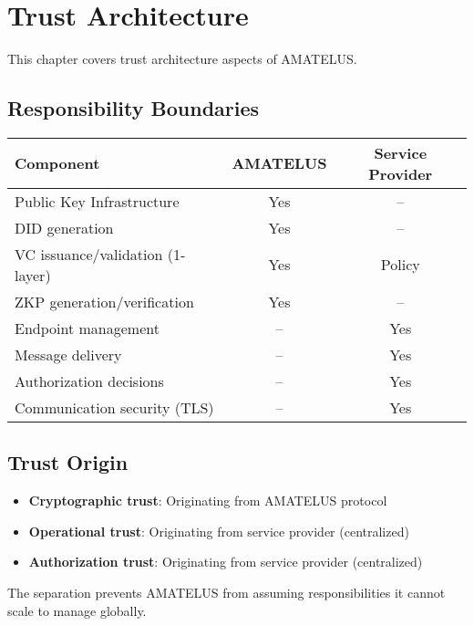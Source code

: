 \chapter{Trust Architecture}


\begin{definition}
  \label{def:trust-chapter}
  This chapter covers trust architecture aspects of AMATELUS.
  \leanok
\end{definition}
\section{Responsibility Boundaries}

\begin{center}
\begin{tabular}{|l|c|c|}
\hline
\textbf{Component} & \textbf{AMATELUS} & \textbf{Service Provider} \\
\hline
Public Key Infrastructure & Yes & -- \\
DID generation & Yes & -- \\
VC issuance/validation (1-layer) & Yes & Policy \\
ZKP generation/verification & Yes & -- \\
Endpoint management & -- & Yes \\
Message delivery & -- & Yes \\
Authorization decisions & -- & Yes \\
Communication security (TLS) & -- & Yes \\
\hline
\end{tabular}
\end{center}

\section{Trust Origin}

\begin{itemize}
  \item \textbf{Cryptographic trust}: Originating from AMATELUS protocol
  \item \textbf{Operational trust}: Originating from service provider (centralized)
  \item \textbf{Authorization trust}: Originating from service provider (centralized)
\end{itemize}

The separation prevents AMATELUS from assuming responsibilities it cannot scale to manage globally.

